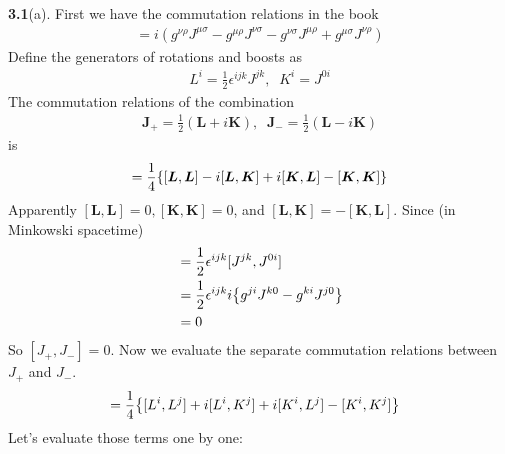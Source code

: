 \documentclass{article}
\newcommand{\bm}[1]{\boldsymbol{#1}}
\begin{document}
{\bf3.1}\quad(a). First we have the commutation relations in the book
\begin{align}
  [J^{\mu\nu},J^{\rho\sigma}]=i(g^{\nu\rho}J^{\mu\sigma}-g^{\mu\rho}J^{\nu\sigma}-g^{\nu\sigma}J^{\mu\rho}+g^{\mu\sigma}J^{\nu\rho})
\end{align}
Define the generators of rotations and boosts as
\begin{align}
  L^i=\frac{1}{2}\epsilon^{ijk}J^{jk}, \;\;K^i=J^{0i}
\end{align}
The commutation relations of the combination
\begin{align}
  \bm{J}_+=\frac{1}{2}(\bm{L}+i\bm{K}),\;\;\bm{J}_-=\frac{1}{2}(\bm{L}-i\bm{K})
\end{align}
is
\begin{align*}
  [\bm{J}_+,\bm{J}_-]=\frac{1}{4}\qty{[\bm{L},\bm{L}]-i[\bm{L},\bm{K}]+i[\bm{K},\bm{L}]-[\bm{K},\bm{K}]}
\end{align*}
Apparently $[\bm{L},\bm{L}]=0, [\bm{K},\bm{K}]=0$, and $[\bm{L},\bm{K}]=-[\bm{K},\bm{L}]$. Since (in Minkowski spacetime)
\begin{align*}
  [L^i,K^i]&=\frac{1}{2}\epsilon^{ijk}[J^{jk},J^{0i}]\\
  &=\frac{1}{2}\epsilon^{ijk}i\qty{g^{ji}J^{k0}-g^{ki}J^{j0}}\\
  &=0
\end{align*}
So $[J_+,J_-]=0$.
Now we evaluate the separate commutation relations between $J_+$ and $J_-$.
\begin{align*}
  [J_+^i,J_+^j]&=\frac{1}{4}\qty{[L^i,L^j]+i[L^i,K^j]+i[K^i,L^j]-[K^i,K^j]}
\end{align*}
Let's evaluate those terms one by one:
\end{document}
